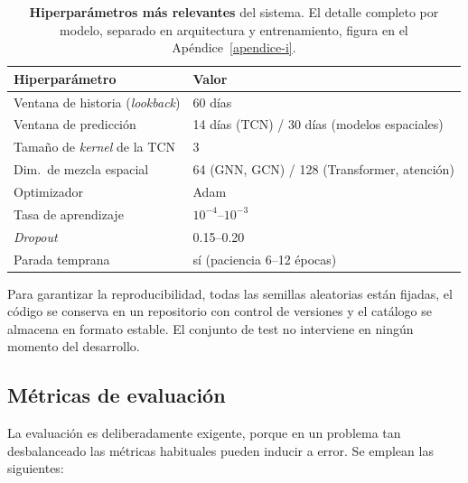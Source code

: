 \begin{table}[ht!]
  \centering
  \small
  \begin{tabular}{@{}ll@{}}
    \toprule
    \textbf{Hiperparámetro}                 & \textbf{Valor}                               \\
    \midrule
    Ventana de historia (\textit{lookback}) & 60 días                                      \\
    Ventana de predicción                   & 14 días (TCN) / 30 días (modelos espaciales) \\
    Tamaño de \textit{kernel} de la TCN     & 3                                            \\
    Dim.\ de mezcla espacial                & 64 (GNN, GCN) / 128 (Transformer, atención)  \\
    Optimizador                             & Adam                                         \\
    Tasa de aprendizaje                     & $10^{-4}$--$10^{-3}$                         \\
    \textit{Dropout}                        & 0.15--0.20                                   \\
    Parada temprana                         & sí (paciencia 6--12 épocas)                  \\
    \bottomrule
  \end{tabular}
  \caption[Hiperparámetros más relevantes del sistema]{\textbf{Hiperparámetros más relevantes} del sistema. El detalle completo por modelo, separado en arquitectura y entrenamiento, figura en el Apéndice~\ref{apendice-i}.}
  \label{tab:hiperparametros}
\end{table}

Para garantizar la reproducibilidad, todas las semillas aleatorias están fijadas, el código
se conserva en un repositorio con control de versiones y el catálogo se almacena en formato
estable. El conjunto de test no interviene en ningún momento del desarrollo.

\subsection{Métricas de evaluación}
\label{md-metricas}

La evaluación es deliberadamente exigente, porque en un problema tan desbalanceado las
métricas habituales pueden inducir a error. Se emplean las siguientes:

